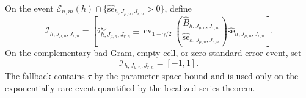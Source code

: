 On the event \(\mathcal E_{n,m}(h)\cap\{\widehat{\mathrm{se}}_{h,J_{\mu,n},J_{r,n}}>0\}\), define
\[
\mathcal I_{h,J_{\mu,n},J_{r,n}}
=\left[
\widehat\tau^{\mathrm{sp}}_{h,J_{\mu,n},J_{r,n}}
\pm
\operatorname{cv}_{1-\gamma/2}\!\left(
\frac{\widehat B_{h,J_{\mu,n},J_{r,n}}}
{\widehat{\mathrm{se}}_{h,J_{\mu,n},J_{r,n}}}
\right)
\widehat{\mathrm{se}}_{h,J_{\mu,n},J_{r,n}}
\right].
\]
On the complementary bad-Gram, empty-cell, or zero-standard-error event, set
\[
\mathcal I_{h,J_{\mu,n},J_{r,n}}=[-1,1].
\]
The fallback contains \(\tau\) by the parameter-space bound and is used only on the exponentially rare event quantified by the localized-series theorem.